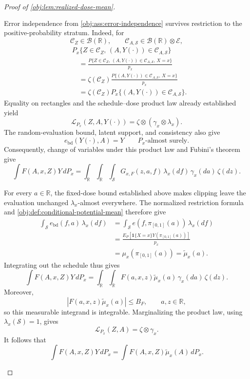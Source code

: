 \documentclass[11pt]{article}
\begin{document}
\begin{proof}[Proof of \cref{obj:lem:realized-dose-mean}]
\begin{enumerate}
Error independence from \cref{obj:ass:error-independence} survives restriction to the positive-probability stratum. Indeed, for
\[
\mathcal C_Z\in\mathcal B(\mathbb R),
\qquad
\mathcal C_{A,\mathcal S}\in\mathcal B(\mathbb R)\otimes\mathcal E,
\]
\[
\begin{aligned}
&P_x\{Z\in\mathcal C_Z,\,(A,Y(\cdot))\in\mathcal C_{A,\mathcal S}\}\\
&\quad=
\frac{P\{Z\in\mathcal C_Z,\,(A,Y(\cdot))\in\mathcal C_{A,\mathcal S},\,X=x\}}{p_x}\\
&\quad=
\zeta(\mathcal C_Z)
\frac{P\{(A,Y(\cdot))\in\mathcal C_{A,\mathcal S},\,X=x\}}{p_x}\\
&\quad=
\zeta(\mathcal C_Z)P_x\{(A,Y(\cdot))\in\mathcal C_{A,\mathcal S}\}.
\end{aligned}
\]
Equality on rectangles and the schedule--dose product law already established yield
\[
\mathcal L_{P_x}(Z,A,Y(\cdot))
=\zeta\otimes(\gamma_x\otimes\lambda_x).
\]
The random-evaluation bound, latent support, and consistency also give
\[
e_{\mathrm{bd}}(Y(\cdot),A)=Y
\qquad P_x\text{-almost surely}.
\]
Consequently, change of variables under this product law and Fubini's theorem give
\[
\int F(A,x,Z)Y\,dP_x
=
\int_{\mathbb R}\int_{\mathbb R}\int_{\mathcal S}
G_{x,F}(z,a,f)\,\lambda_x(df)\,\gamma_x(da)\,\zeta(dz).
\]

For every \(a\in\mathbb R\), the fixed-dose bound established above makes clipping leave the evaluation unchanged \(\lambda_x\)-almost everywhere. The normalized restriction formula and
\cref{obj:def:conditional-potential-mean} therefore give
\[
\begin{aligned}
\int_{\mathcal S}e_{\mathrm{bd}}(f,a)\,\lambda_x(df)
&=\int_{\mathcal S}e(f,\pi_{[0,1]}(a))\,\lambda_x(df)\\
&=\frac{E_P[\mathbf1\{X=x\}Y(\pi_{[0,1]}(a))]}{p_x}\\
&=\mu_x(\pi_{[0,1]}(a))
=\widetilde\mu_x(a).
\end{aligned}
\]
Integrating out the schedule thus gives
\[
\int F(A,x,Z)Y\,dP_x
=
\int_{\mathbb R}\int_{\mathbb R}
F(a,x,z)\widetilde\mu_x(a)\,\gamma_x(da)\,\zeta(dz).
\]
Moreover,
\[
|F(a,x,z)\widetilde\mu_x(a)|\le B_F,
\qquad a,z\in\mathbb R,
\]
so this measurable integrand is integrable. Marginalizing the product law, using
\(\lambda_x(\mathcal S)=1\), gives
\[
\mathcal L_{P_x}(Z,A)=\zeta\otimes\gamma_x.
\]
It follows that
\[
\int F(A,x,Z)Y\,dP_x
=
\int F(A,x,Z)\widetilde\mu_x(A)\,dP_x.
\]


\end{enumerate}
\end{proof}
\end{document}
